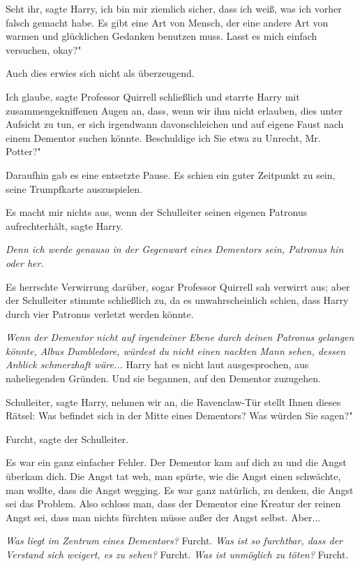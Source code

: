 \glqq Seht ihr\grqq{}, sagte Harry, \glqq ich bin mir ziemlich sicher, dass ich
weiß, was ich vorher falsch gemacht habe. Es gibt eine Art von Mensch, der eine
andere Art von warmen und glücklichen Gedanken benutzen muss. Lasst es mich
einfach versuchen, okay?"

Auch dies erwies sich nicht als überzeugend.

\glqq Ich glaube\grqq{}, sagte Professor Quirrell schließlich und starrte Harry
mit zusammengekniffenen Augen an, \glqq dass, wenn wir ihm nicht erlauben, dies
unter Aufsicht zu tun, er sich irgendwann davonschleichen und auf eigene Faust
nach einem Dementor suchen könnte. Beschuldige ich Sie etwa zu Unrecht, Mr.
Potter?"

Daraufhin gab es eine entsetzte Pause. Es schien ein guter Zeitpunkt zu sein,
seine Trumpfkarte auszuspielen.

\glqq Es macht mir nichts aus, wenn der Schulleiter seinen eigenen Patronus
aufrechterhält\grqq{}, sagte Harry.

\emph{Denn ich werde genauso in der Gegenwart eines Dementors sein, Patronus hin oder her. }

Es herrschte Verwirrung darüber, sogar Professor Quirrell sah verwirrt aus; aber
der Schulleiter stimmte schließlich zu, da es unwahrscheinlich schien, dass
Harry durch vier Patronus verletzt werden könnte.

\emph{Wenn der Dementor nicht auf irgendeiner Ebene durch deinen Patronus gelangen könnte, Albus Dumbledore, würdest du nicht einen nackten Mann sehen, dessen Anblick schmerzhaft wäre... }
Harry hat es nicht laut ausgesprochen, aus naheliegenden Gründen. Und sie
begannen, auf den Dementor zuzugehen.

\glqq Schulleiter\grqq{}, sagte Harry, \glqq nehmen wir an, die Ravenclaw-Tür
stellt Ihnen dieses Rätsel: Was befindet sich in der Mitte eines Dementors? Was
würden Sie sagen?"

\glqq Furcht\grqq{}, sagte der Schulleiter.

Es war ein ganz einfacher Fehler. Der Dementor kam auf dich zu und die Angst
überkam dich. Die Angst tat weh, man spürte, wie die Angst einen schwächte, man
wollte, dass die Angst wegging. Es war ganz natürlich, zu denken, die Angst sei
das Problem. Also schloss man, dass der Dementor eine Kreatur der reinen Angst
sei, dass man nichts fürchten müsse außer der Angst selbst. Aber...

\emph{Was liegt im Zentrum eines Dementors? }
Furcht.
\emph{Was ist so furchtbar, dass der Verstand sich weigert, es zu sehen? }
Furcht.
\emph{ Was ist unmöglich zu töten? }
Furcht.

